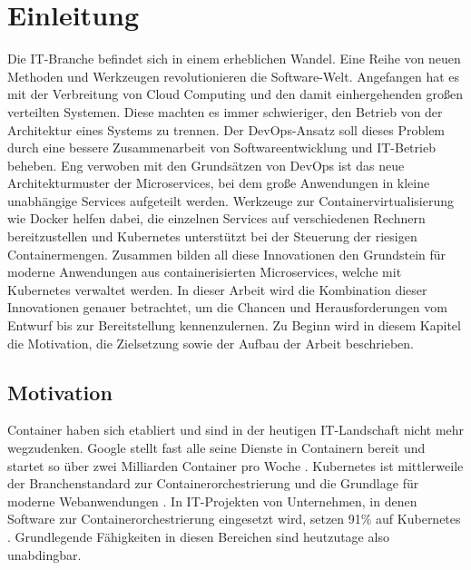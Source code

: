 \section{Einleitung}

\vspace{1em} 

Die IT-Branche befindet sich in einem erheblichen Wandel. Eine Reihe von neuen Methoden und Werkzeugen revolutionieren die Software-Welt. Angefangen hat es mit der Verbreitung von Cloud Computing und den damit einhergehenden großen verteilten Systemen. Diese machten es immer schwieriger, den Betrieb von der Architektur eines Systems zu trennen. Der DevOps-Ansatz soll dieses Problem durch eine bessere Zusammenarbeit von Softwareentwicklung und IT-Betrieb beheben. Eng verwoben mit den Grundsätzen von DevOps ist das neue Architekturmuster der Microservices, bei dem große Anwendungen in kleine unabhängige Services aufgeteilt werden. Werkzeuge zur Containervirtualisierung wie Docker helfen dabei, die einzelnen Services auf verschiedenen Rechnern bereitzustellen und Kubernetes unterstützt bei der Steuerung der riesigen Containermengen. Zusammen bilden all diese Innovationen den Grundstein für moderne Anwendungen aus containerisierten Microservices, welche mit Kubernetes verwaltet werden. In dieser Arbeit wird die Kombination dieser Innovationen genauer betrachtet, um die Chancen und Herausforderungen vom Entwurf bis zur Bereitstellung kennenzulernen. Zu Beginn wird in diesem Kapitel die Motivation, die Zielsetzung sowie der Aufbau der Arbeit beschrieben.

\subsection{Motivation}
Container haben sich etabliert und sind in der heutigen IT-Landschaft nicht mehr wegzudenken. Google stellt fast alle seine Dienste in Containern bereit und startet so über zwei Milliarden Container pro Woche \parencite[vgl.][S. 43]{liebelSkalierbare2021}. Kubernetes ist mittlerweile der Branchenstandard zur Containerorchestrierung und die Grundlage für moderne Webanwendungen \parencite[vgl.][Vorwort]{arundelCloud2019}. In IT-Projekten von Unternehmen, in denen Software zur Containerorchestrierung eingesetzt wird, setzen 91\% auf Kubernetes \parencite[vgl.][S. 8]{cloudnativecomputingfoundationCloud2020}. Grundlegende Fähigkeiten in diesen Bereichen sind heutzutage also unabdingbar.

